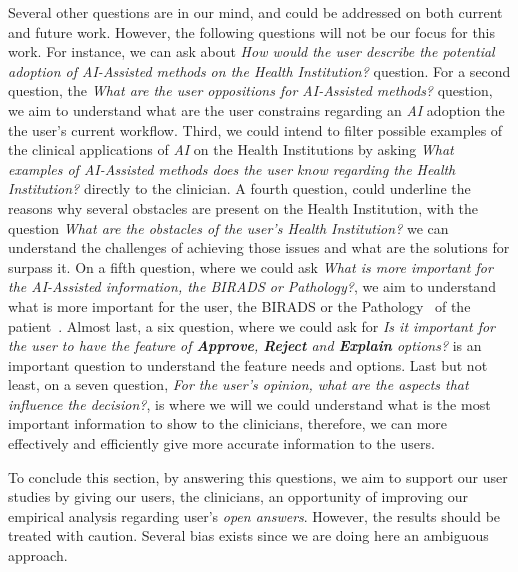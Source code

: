 Several other questions are in our mind, and could be addressed on both current and future work. However, the following questions will not be our focus for this work. For instance, we can ask about \textit{How would the user describe the potential adoption of \textit{AI-Assisted} methods on the Health Institution?} question. For a second question, the \textit{What are the user oppositions for \textit{AI-Assisted} methods?} question, we aim to understand what are the user constrains regarding an {\it AI} adoption the the user's current workflow. Third, we could intend to filter possible examples of the clinical applications of {\it AI} on the Health Institutions by asking \textit{What examples of \textit{AI-Assisted} methods does the user know regarding the Health Institution?} directly to the clinician. A fourth question, could underline the reasons why several obstacles are present on the Health Institution, with the question \textit{What are the obstacles of the user's Health Institution?} we can understand the challenges of achieving those issues and what are the solutions for surpass it. On a fifth question, where we could ask \textit{What is more important for the \textit{AI-Assisted} information, the BIRADS or Pathology?}, we aim to understand what is more important for the user, the BIRADS or the Pathology~\cite{maicas2018pre} of the patient~\cite{elverici2015nonpalpable}. Almost last, a six question, where we could ask for \textit{Is it important for the user to have the feature of \textbf{Approve}, \textbf{Reject} and \textbf{Explain} options?} is an important question to understand the feature needs and options. Last but not least, on a seven question, \textit{For the user's opinion, what are the aspects that influence the decision?}, is where we will we could understand what is the most important information to show to the clinicians, therefore, we can more effectively and efficiently give more accurate information to the users.

To conclude this section, by answering this questions, we aim to support our user studies by giving our users, the clinicians, an opportunity of improving our empirical analysis regarding user's \textit{open answers}. However, the results should be treated with caution. Several bias exists since we are doing here an ambiguous approach.